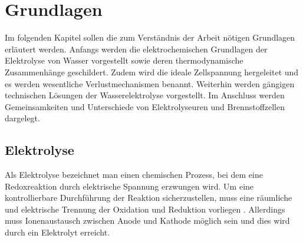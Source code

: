 \chapter{Grundlagen}
\label{cha:Grundlagen}
Im folgenden Kapitel sollen die zum Verständnis der Arbeit nötigen Grundlagen erläutert werden. Anfangs werden die elektrochemischen Grundlagen der Elektrolyse von Wasser vorgestellt sowie deren thermodynamische Zusammenhänge geschildert. Zudem wird die ideale Zellspannung hergeleitet und es werden wesentliche Verlustmechanismen benannt. Weiterhin werden gängigen technischen Lösungen der Wasserelektrolyse vorgestellt. Im Anschluss werden Gemeinsamkeiten und Unterschiede von Elektrolyseuren und Brennstoffzellen dargelegt. \\


\section{Elektrolyse}
\label{sec:Elektrolyse}
Als Elektrolyse bezeichnet man einen chemischen Prozess, bei dem eine Redoxreaktion durch elektrische Spannung erzwungen wird. 
Um eine kontrollierbare Durchführung der Reaktion sicherzustellen, muss eine räumliche und elektrische Trennung der Oxidation und Reduktion vorliegen \cite{Tjaarks}. Allerdings muss Ionenaustausch zwischen Anode und Kathode möglich sein und dies wird durch ein Elektrolyt erreicht.

